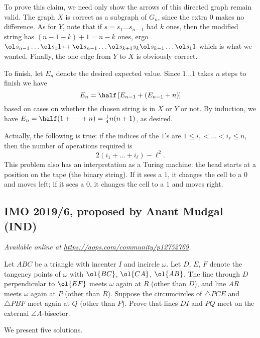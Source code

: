 \documentclass[11pt]{scrartcl}
\begin{document}
To prove this claim, we need only show
the arrows of this directed graph remain valid.
The graph $X$ is correct as a subgraph of $G_n$,
since the extra $0$ makes no difference.
As for $Y$, note that if $s = s_1 \dots s_{n-1}$ had $k$ ones,
then the modified string has $(n-1-k)+1 = n-k$ ones, ergo
$\ol s_{n-1} \dots \ol s_1 1
\mapsto  \ol s_{n-1} \dots \ol s_{k+1} s_k \ol s_{k-1} \dots \ol s_1 1$
which is what we wanted.
Finally, the one edge from $Y$ to $X$ is obviously correct.

To finish, let $E_n$ denote the desired expected value.
Since $1 \dots 1$ takes $n$ steps to finish we have
\[ E_n = \half \left[ E_{n-1} + (E_{n-1}+n) \right] \]
based on cases on whether the chosen string is in $X$ or $Y$ or not.
By induction, we have $E_n = \half (1 + \dots + n) = \frac14 n(n+1)$,
as desired.

\begin{remark*}
  Actually, the following is true:
  if the indices of the $1$'s are $1 \le i_1 < \dots < i_\ell \le n$,
  then the number of operations required is
  \[ 2(i_1 + \dots + i_\ell) - \ell^2. \]
  This problem also has an interpretation as a Turing machine:
  the head starts at a position on the tape (the binary string).
  If it sees a $1$, it changes the cell to a $0$ and moves left;
  if it sees a $0$, it changes the cell to a $1$ and moves right.
\end{remark*}
\pagebreak

\subsection{IMO 2019/6, proposed by Anant Mudgal (IND)}
\textsl{Available online at \url{https://aops.com/community/p12752769}.}
\begin{mdframed}[style=mdpurplebox,frametitle={Problem statement}]
Let $ABC$ be a triangle with incenter $I$ and incircle $\omega$.
Let $D$, $E$, $F$ denote the tangency points of $\omega$ with $\ol{BC}$, $\ol{CA}$, $\ol{AB}$.
The line through $D$ perpendicular to $\ol{EF}$ meets $\omega$ again at $R$ (other than $D$),
and line $AR$ meets $\omega$ again at $P$ (other than $R$).
Suppose the circumcircles of $\triangle PCE$ and $\triangle PBF$ meet again at $Q$ (other than $P$).
Prove that lines $DI$ and $PQ$ meet on the external $\angle A$-bisector.
\end{mdframed}
We present five solutions.
\end{document}
